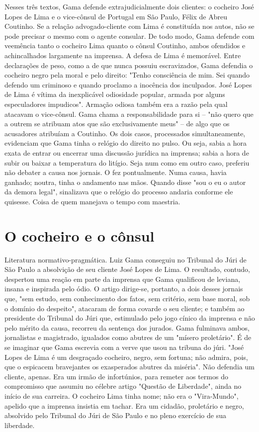 {\small\noindent
Nesses três textos, Gama defende extrajudicialmente dois clientes:
o cocheiro José Lopes de Lima e o vice-cônsul de Portugal em São Paulo,
Félix de Abreu Coutinho. Se a relação advogado-cliente com Lima é
constituída nos autos, não se pode precisar o mesmo com o agente
consular. De todo modo, Gama defende com veemência tanto o cocheiro Lima
quanto o cônsul Coutinho, ambos ofendidos e achincalhados largamente na
imprensa. A defesa de Lima é memorável. Entre declarações de peso, como
a de que nunca possuiu escravizados, Gama defendia o cocheiro negro pela
moral e pelo direito: "Tenho consciência de mim. Sei quando defendo um
criminoso e quando proclamo a inocência dos inculpados. José Lopes de
Lima é vítima da inexplicável odiosidade popular, armada por alguns
especuladores impudicos". Armação odiosa também era a razão pela qual
atacavam o vice-cônsul. Gama chama a responsabilidade para si -- "não
quero que a outrem se atribuam atos que são exclusivamente meus" -- de
algo que os acusadores atribuíam a Coutinho. Os dois casos, processados
simultaneamente, evidenciam que Gama tinha o relógio do direito no
pulso. Ou seja, sabia a hora exata de entrar ou encerrar uma discussão
jurídica na imprensa; sabia a hora de subir ou baixar a temperatura do
litígio. Seja num como em outro caso, preferiu não debater a causa nos
jornais. O fez pontualmente. Numa causa, havia ganhado; noutra, tinha o
andamento nas mãos. Quando disse "sou o eu o autor da demora legal",
sinalizava que o relógio do processo andaria conforme ele quisesse.
Coisa de quem manejava o tempo com maestria. }

\part{O cocheiro e o cônsul}

\pagebreak
\mbox{}\vfill
\thispagestyle{empty}

{\small\noindent
Literatura normativo-pragmática. Luiz Gama conseguiu no Tribunal
do Júri de São Paulo a absolvição de seu cliente José Lopes de Lima. O
resultado, contudo, despertou uma reação em parte da imprensa que Gama
qualificou de leviana, insana e inspirada pelo ódio. O artigo dirige-se,
portanto, a dois desses jornais que, "sem estudo, sem conhecimento dos
fatos, sem critério, sem base moral, sob o domínio do despeito",
atacaram de forma covarde o seu cliente; e também ao presidente do
Tribunal do Júri que, estimulado pelo jogo cínico da imprensa e não pelo
mérito da causa, recorreu da sentença dos jurados. Gama fulminava ambos,
jornalistas e magistrado, igualados como abutres de um "mísero
proletário". É de se imaginar que Gama escrevia com a verve que usou na
tribuna do júri. "José Lopes de Lima é um desgraçado cocheiro, negro,
sem fortuna; não admira, pois, que o espicacem bravejantes os
exasperados abutres da miséria". Não defendia um cliente, apenas. Era um
irmão de infortúnios, para remeter aos termos do compromisso que assumiu
no célebre artigo "Questão de Liberdade", ainda no início de sua
carreira. O cocheiro Lima tinha nome; não era o "Vira-Mundo", apelido
que a imprensa insistia em tachar. Era um cidadão, proletário e negro,
absolvido pelo Tribunal do Júri de São Paulo e no pleno exercício de sua
liberdade. }

